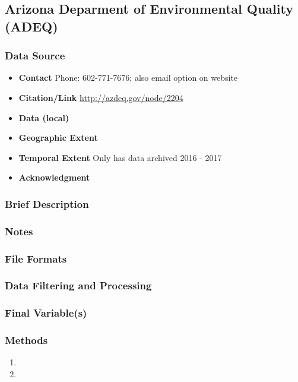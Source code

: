 \subsection{Arizona Deparment of Environmental Quality (ADEQ)}

\subsubsection*{Data Source}

\begin{itemize}[nolistsep]
\item \textbf{Contact}  Phone: 602-771-7676; also email option on website
\item \textbf{Citation/Link} \url{http://azdeq.gov/node/2204}
\item \textbf{Data (local)} 
\item \textbf{Geographic Extent} 
\item \textbf{Temporal Extent} 
Only has data archived 2016 - 2017
\item \textbf{Acknowledgment} 
\end{itemize}

\subsubsection*{Brief Description}

\subsubsection*{Notes}

\subsubsection*{File Formats} 

\subsubsection*{Data Filtering and Processing}

\subsubsection*{Final Variable(s)}

\subsubsection*{Methods}

\begin{enumerate}
\item 
\item
\end{enumerate}

